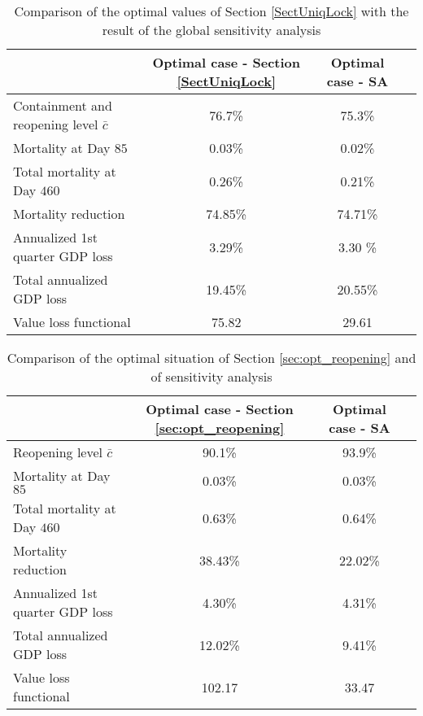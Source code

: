 \documentclass{amsart}
\begin{document}
\begin{table}[htbp]
  \centering
  \caption{Comparison of the optimal values of Section \ref{SectUniqLock} with the result of 
  the global sensitivity analysis
 }
  
    \begin{tabular}{lccc}
          &  \multicolumn{1}{c}{Optimal case - Section \ref{SectUniqLock} } & \multicolumn{1}{c}{Optimal case - SA } \\ \hline \vspace{0.1cm}
    Containment and reopening level $\bar{c}$ & 76.7\% & 75.3\%  \\  \vspace{0.1cm}   
   Mortality at Day $85$ & 0.03\%  &  0.02\%    \\ \vspace{0.1cm}
    Total mortality at Day $460$ & 0.26\% & 0.21\%    \\ \vspace{0.1cm}
    Mortality reduction & 74.85\%  & 74.71\%  \\ \vspace{0.1cm}
    Annualized 1st quarter GDP loss & 3.29\%  & 3.30 \%   \\ \vspace{0.1cm} Total annualized GDP loss & 19.45\% & 20.55\%   \\ \vspace{0.1cm}   
     Value loss functional & 75.82 & 29.61  \\ \hline    
    \end{tabular}%
  \label{tab:sens_case1}%
\end{table}%


\begin{table}[htbp]
  \centering
  \caption{Comparison of the optimal situation of Section \ref{sec:opt_reopening} and of sensitivity analysis}
    \begin{tabular}{lccc}
          &  \multicolumn{1}{c}{Optimal case - Section \ref{sec:opt_reopening} } & \multicolumn{1}{c}{Optimal case - SA } \\ \hline \vspace{0.1cm}
    Reopening level $\bar{c}$ & 90.1\% & 93.9\%  \\  \vspace{0.1cm}   
   Mortality at Day $85$ & 0.03\%  & 0.03\%      \\ \vspace{0.1cm}
    Total mortality at Day $460$ & 0.63\% & 0.64\%    \\ \vspace{0.1cm}
    Mortality reduction & 38.43\% & 22.02\%  \\ \vspace{0.1cm}
    Annualized 1st quarter GDP loss & 4.30\%  & 4.31\%    \\ \vspace{0.1cm} Total annualized GDP loss & 12.02\%  & 9.41\%   \\ \vspace{0.1cm}   
     Value loss functional & 102.17 & 33.47  \\ \hline    
    \end{tabular}%
  \label{tab:sens_case2}%
\end{table}%
\end{document}
